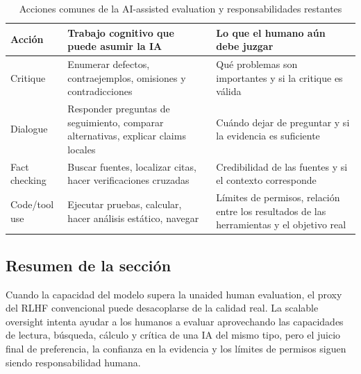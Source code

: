 \begin{table}[H]
\centering
\caption{Acciones comunes de la AI-assisted evaluation y responsabilidades restantes}
\begin{tabularx}{\textwidth}{L{2.6cm} X X}
\toprule
Acción & Trabajo cognitivo que puede asumir la IA & Lo que el humano aún debe juzgar \\
\midrule
Critique & Enumerar defectos, contraejemplos, omisiones y contradicciones & Qué problemas son importantes y si la critique es válida \\
Dialogue & Responder preguntas de seguimiento, comparar alternativas, explicar claims locales & Cuándo dejar de preguntar y si la evidencia es suficiente \\
Fact checking & Buscar fuentes, localizar citas, hacer verificaciones cruzadas & Credibilidad de las fuentes y si el contexto corresponde \\
Code/tool use & Ejecutar pruebas, calcular, hacer análisis estático, navegar & Límites de permisos, relación entre los resultados de las herramientas y el objetivo real \\
\bottomrule
\end{tabularx}
\end{table}

\subsection{Resumen de la sección}

Cuando la capacidad del modelo supera la unaided human evaluation, el proxy del RLHF convencional puede desacoplarse de la calidad real. La scalable oversight intenta ayudar a los humanos a evaluar aprovechando las capacidades de lectura, búsqueda, cálculo y crítica de una IA del mismo tipo, pero el juicio final de preferencia, la confianza en la evidencia y los límites de permisos siguen siendo responsabilidad humana.
